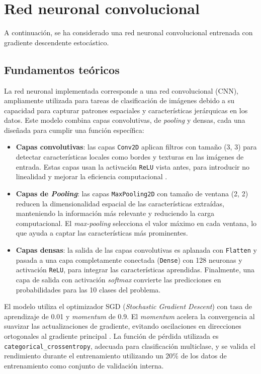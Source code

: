 \section{Red neuronal convolucional}

A continuación, se ha considerado una red neuronal convolucional entrenada con gradiente descendente estocástico.

\subsection{Fundamentos teóricos}

La red neuronal implementada corresponde a una red convolucional (CNN), ampliamente utilizada para tareas de clasificación de imágenes debido a su capacidad para capturar patrones espaciales y características jerárquicas en los datos. Este modelo combina capas convolutivas, de \textit{pooling} y densas, cada una diseñada para cumplir una función específica:

\begin{itemize}
	\item \textbf{Capas convolutivas}: las capas \texttt{Conv2D} aplican filtros con tamaño (3, 3) para detectar características locales como bordes y texturas en las imágenes de entrada. Estas capas usan la activación \texttt{ReLU} vista antes, para introducir no linealidad y mejorar la eficiencia computacional \parencite{nair2010relu}.
	\item \textbf{Capas de \textit{Pooling}}: las capas \texttt{MaxPooling2D} con tamaño de ventana (2, 2) reducen la dimensionalidad espacial de las características extraídas, manteniendo la información más relevante y reduciendo la carga computacional. El \textit{max-pooling} selecciona el valor máximo en cada ventana, lo que ayuda a captar las características más prominentes.
	\item \textbf{Capas densas}: la salida de las capas convolutivas es aplanada con \texttt{Flatten} y pasada a una capa completamente conectada (\texttt{Dense}) con 128 neuronas y activación \texttt{ReLU}, para integrar las características aprendidas. Finalmente, una capa de salida con activación \textit{softmax} convierte las predicciones en probabilidades para las 10 clases del problema.
\end{itemize}

El modelo utiliza el optimizador SGD (\textit{Stochastic Gradient Descent}) con tasa de aprendizaje de 0.01 y \textit{momentum} de 0.9. El \textit{momentum} acelera la convergencia al suavizar las actualizaciones de gradiente, evitando oscilaciones en direcciones ortogonales al gradiente principal \parencite{sutskever2013momentum}. La función de pérdida utilizada es \texttt{categorical\_crossentropy}, adecuada para clasificación multiclase, y se valida el rendimiento durante el entrenamiento utilizando un 20\% de los datos de entrenamiento como conjunto de validación interna.

